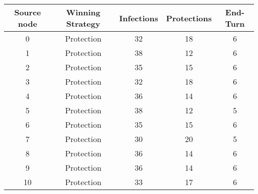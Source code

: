 \documentclass[results.tex]{subfiles}
\begin{document}
    \begin{center}
        \begin{tabular}{| c || c | c | c | c |}
            \hline
            {\bfseries Source node} & {\bfseries Winning Strategy} & {\bfseries Infections} & {\bfseries Protections}
            & {\bfseries End-Turn}
            \\  %
            \hline\hline
            0                       & Protection                   & 32                     & 18                      & 6                    \\
            \hline
            1                       & Protection                   & 38                     & 12                      & 6                    \\
            \hline
            2                       & Protection                   & 35                     & 15                      & 6                    \\
            \hline
            3                       & Protection                   & 32                     & 18                      & 6                    \\
            \hline
            4                       & Protection                   & 36                     & 14                      & 6                    \\
            \hline
            5                       & Protection                   & 38                     & 12                      & 5                    \\
            \hline
            6                       & Protection                   & 35                     & 15                      & 6                    \\
            \hline
            7                       & Protection                   & 30                     & 20                      & 5                    \\
            \hline
            8                       & Protection                   & 36                     & 14                      & 6                    \\
            \hline
            9                       & Protection                   & 36                     & 14                      & 6                    \\
            \hline
            10                      & Protection                   & 33                     & 17                      & 6                    \\

\end{tabular}
\end{center}
\end{document}
